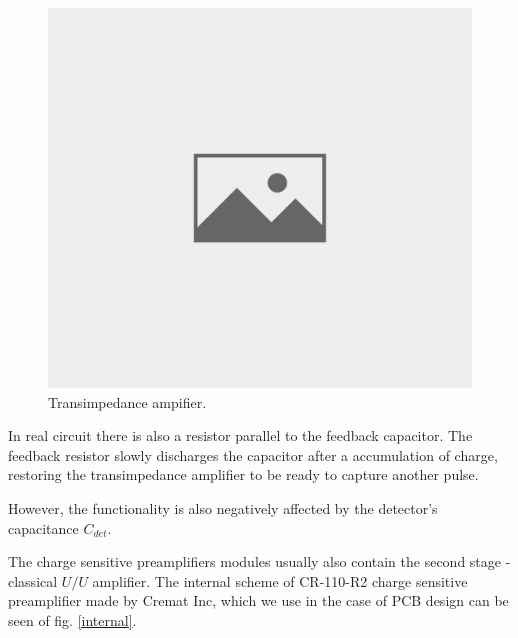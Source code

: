 \begin{figure}[H]
 \centering
 \includegraphics[scale=0.35, angle = 0]{./pictures/NoPicture.jpg}
 \caption{Transimpedance ampifier.}
 \label{trans}
 
\end{figure}



\par
In real circuit there is also a resistor parallel to the feedback capacitor. The feedback resistor slowly discharges the capacitor after a accumulation of charge, restoring the transimpedance amplifier to be ready to capture another pulse.  


However, the functionality is also negatively affected by the detector's capacitance $C_{det}$.

\par
The charge sensitive preamplifiers modules usually also contain the second stage - classical $U/U$ amplifier. The internal scheme of CR-110-R2 charge sensitive preamplifier made by Cremat Inc, which we use in the case of PCB design can be seen of fig. \ref{internal}.

\par


